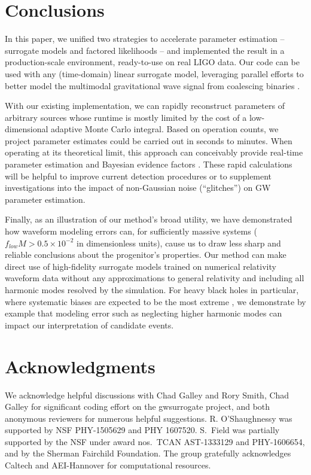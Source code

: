 \documentclass[aps,prd,nofootinbib,showpacs,amssymb,twocolumn]{revtex4}
\begin{document}
\section{Conclusions}
\label{sec:Conclusions}

In this paper, we unified two strategies to accelerate parameter estimation -- surrogate models  and factored
likelihoods -- and implemented the result in a production-scale environment, ready-to-use on real LIGO data.  
  Our code 
%
can be used with any (time-domain) linear surrogate model,
 leveraging parallel efforts to better model the multimodal gravitational wave signal from coalescing binaries
\cite{gwastro-PE-AlternativeArchitectures,gwastro-mergers-PE-ReducedOrder-2013,2014PhRvX...4c1006F,gwastro-approx-ROMNR-Blackman2015}.     

With our existing implementation, we can rapidly reconstruct parameters of arbitrary sources
%
whose runtime is mostly
limited 
%
by the cost of a low-dimensional adaptive Monte Carlo integral. 
%
%
Based on operation counts, we project parameter estimates could be carried out in seconds to minutes.
%
When operating at its
theoretical limit, this approach can conceivably provide real-time parameter estimation and Bayesian evidence
factors \cite{2009PhRvD..80f3007L,2015arXiv151105955L,2016PhRvD..93b2002K}.  These rapid
calculations will be helpful to improve current detection procedures %
%
or to supplement investigations into the impact of non-Gaussian noise (``glitches'') on GW parameter
estimation.
%
%
%

Finally, as an illustration of our method's broad utility, we 
%
have demonstrated
how waveform modeling errors  can, for sufficiently massive 
%
systems ($f_{low} M > 0.5 \times 10^{-2}$ in dimensionless units), cause us to draw less sharp and reliable conclusions about the progenitor's properties. 
%
Our method can make direct use of
 high-fidelity surrogate models  trained 
%
on numerical relativity waveform data without any approximations to general relativity and including all harmonic modes resolved by the simulation. For heavy black holes in particular, where
%
systematic biases are expected to be the most extreme \cite{2014PhRvD..90l4004V,gwastro-Varma-2016,2016PhRvD..93h4019C}, we demonstrate by example that modeling error 
such as neglecting higher harmonic modes can impact our interpretation of candidate events. 


%
%
%
\section{Acknowledgments}
\noindent We acknowledge helpful discussions with
Chad Galley and
Rory Smith, Chad Galley for significant coding effort on the
gwsurrogate project, and both anonymous reviewers for numerous helpful suggestions.
R. O'Shaughnessy was supported by NSF PHY-1505629 and PHY 1607520.  
%
S.~Field was partially supported by the NSF under award nos.\ TCAN
AST-1333129 and PHY-1606654, and by the Sherman Fairchild Foundation.
The group gratefully acknowledges  Caltech and AEI-Hannover for computational resources.%
%


%

\end{document}
